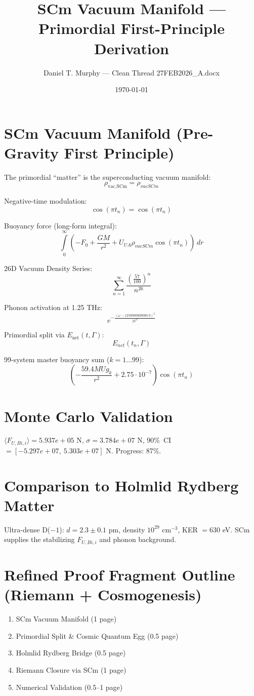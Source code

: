\documentclass{article}
\title{SCm Vacuum Manifold --- Primordial First-Principle Derivation}
\author{Daniel T. Murphy --- Clean Thread 27FEB2026\_A.docx}
\date{\today}
\begin{document}
\maketitle

\section{SCm Vacuum Manifold (Pre-Gravity First Principle)}
The primordial ``matter'' is the superconducting vacuum manifold:
\[
\rho_{\text{vac,SCm}} = \rho_{vac SCm}
\]

Negative-time modulation:
\[
\cos(\pi t_n) = \cos{\left(\pi t_{n} \right)}
\]

Buoyancy force (long-form integral):
\[
\int\limits_{0}^{\infty} \left(- F_{0} + \frac{G M}{r^{2}} + U_{UA} \rho_{vac SCm} \cos{\left(\pi t_{n} \right)}\right)\, dr
\]

26D Vacuum Density Series:
\[
\sum_{n=1}^{\infty} \frac{\left(\frac{57}{100}\right)^{n}}{n^{26}}
\]

Phonon activation at 1.25 THz:
\[
e^{- \frac{\left(\omega - 1250000000000.0\right)^{2}}{2 \Gamma^{2}}}
\]

Primordial split via $E_{\mathrm{net}}(t, \Gamma)$:
\[
E_{net}{\left(t_{n},\Gamma \right)}
\]

99-system master buoyancy sum ($k = 1 \ldots 99$):
\[
\left(- \frac{59.4 M Ug_{k}}{r^{2}} + 2.75 \cdot 10^{-7}\right) \cos{\left(\pi t_{n} \right)}
\]

\section{Monte Carlo Validation}
$\langle F_{U,Bi,i} \rangle = 5.937e+05$ N, $\sigma = 3.784e+07$ N, 90\%\ CI $= [-5.297e+07,\ 5.303e+07]$ N. Progress: 87\%.

\section{Comparison to Holmlid Rydberg Matter}
Ultra-dense D($-1$): $d = 2.3 \pm 0.1$ pm, density $10^{29}$ cm$^{-3}$, KER $= 630$ eV.
SCm supplies the stabilizing $F_{U,Bi,i}$ and phonon background.

\section{Refined Proof Fragment Outline (Riemann + Cosmogenesis)}
\begin{enumerate}
\item SCm Vacuum Manifold (1 page)
\item Primordial Split \& Cosmic Quantum Egg (0.5 page)
\item Holmlid Rydberg Bridge (0.5 page)
\item Riemann Closure via SCm (1 page)
\item Numerical Validation (0.5--1 page)
\end{enumerate}
\end{document}
